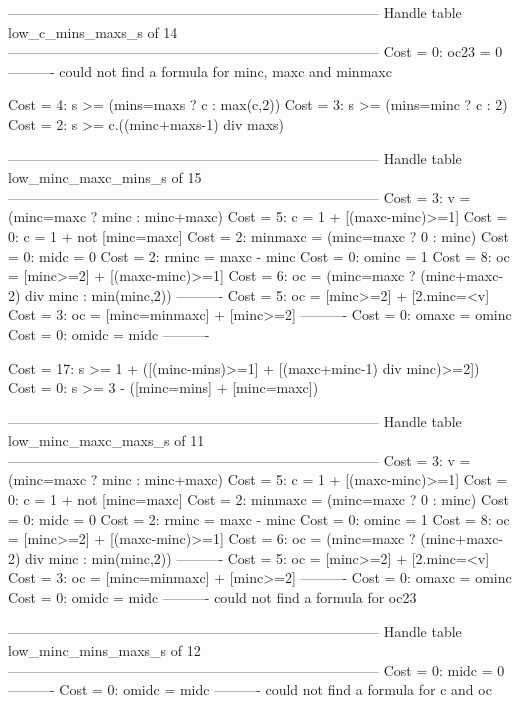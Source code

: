 --------------------------------------------------------------------------------
Handle table low_c_mins_maxs_s of 14
--------------------------------------------------------------------------------
Cost =  0:  oc23    = 0
----------
could not find a formula for minc, maxc and minmaxc

Cost =  4:  s >= (mins=maxs ? c : max(c,2))
Cost =  3:  s >= (mins=minc ? c : 2)
Cost =  2:  s >= c.((minc+maxs-1) div maxs)

--------------------------------------------------------------------------------
Handle table low_minc_maxc_mins_s of 15
--------------------------------------------------------------------------------
Cost =  3:  v       = (minc=maxc ? minc : minc+maxc)
Cost =  5:  c       = 1 + [(maxc-minc)>=1]
Cost =  0:  c       = 1 + not [minc=maxc]
Cost =  2:  minmaxc = (minc=maxc ? 0 : minc)
Cost =  0:  midc    = 0
Cost =  2:  rminc   = maxc - minc
Cost =  0:  ominc   = 1
Cost =  8:  oc      = [minc>=2] + [(maxc-minc)>=1]
Cost =  6:  oc      = (minc=maxc ? (minc+maxc-2) div minc : min(minc,2))
----------
Cost =  5:  oc      = [minc>=2] + [2.minc=<v]
Cost =  3:  oc      = [minc=minmaxc] + [minc>=2]
----------
Cost =  0:  omaxc   = ominc
Cost =  0:  omidc   = midc
----------

Cost = 17:  s >= 1 + ([(minc-mins)>=1] + [(maxc+minc-1) div minc)>=2])
Cost =  0:  s >= 3 - ([minc=mins] + [minc=maxc])

--------------------------------------------------------------------------------
Handle table low_minc_maxc_maxs_s of 11
--------------------------------------------------------------------------------
Cost =  3:  v       = (minc=maxc ? minc : minc+maxc)
Cost =  5:  c       = 1 + [(maxc-minc)>=1]
Cost =  0:  c       = 1 + not [minc=maxc]
Cost =  2:  minmaxc = (minc=maxc ? 0 : minc)
Cost =  0:  midc    = 0
Cost =  2:  rminc   = maxc - minc
Cost =  0:  ominc   = 1
Cost =  8:  oc      = [minc>=2] + [(maxc-minc)>=1]
Cost =  6:  oc      = (minc=maxc ? (minc+maxc-2) div minc : min(minc,2))
----------
Cost =  5:  oc      = [minc>=2] + [2.minc=<v]
Cost =  3:  oc      = [minc=minmaxc] + [minc>=2]
----------
Cost =  0:  omaxc   = ominc
Cost =  0:  omidc   = midc
----------
could not find a formula for oc23


--------------------------------------------------------------------------------
Handle table low_minc_mins_maxs_s of 12
--------------------------------------------------------------------------------
Cost =  0:  midc  = 0
----------
Cost =  0:  omidc = midc
----------
could not find a formula for c and oc


